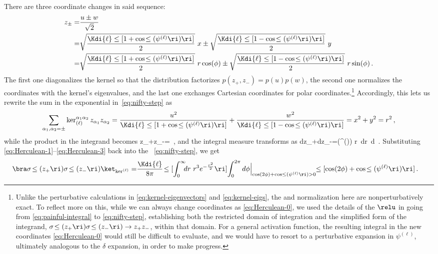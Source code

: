 There are three coordinate changes in said sequence:
\begin{align}\label{eq:Herculean-0}
z_{\pm}=&\frac{u\pm w}{\sqrt{2}} \\ 
=&\sqrt{\frac{\Kdi{\ell}\le[1+\cos\!\le(\psi^{(\ell)}\ri)\ri]}{2}}\ x \pm \sqrt{\frac{\Kdi{\ell}\le[1-\cos\!\le(\psi^{(\ell)}\ri)\ri]}{2}}\ y\, \notag \\
=&\sqrt{\frac{\Kdi{\ell}\le[1+\cos\!\le(\psi^{(\ell)}\ri)\ri]}{2}}\ r\cos(\phi) \pm \sqrt{\frac{\Kdi{\ell}\le[1-\cos\!\le(\psi^{(\ell)}\ri)\ri]}{2}}\ r\sin(\phi)\, .\notag
\end{align}
The first one diagonalizes the kernel so that the distribution factorizes $p(z_+,z_-) = p(u) p(w)$, the second one normalizes the coordinates with the kernel's eigenvalues, and the last one exchanges Cartesian coordinates for polar coordinates.\footnote{Unlike the perturbative calculations in \eqref{eq:kernel-eigenvectors} and \eqref{eq:kernel-eigs}, the  and normalization here are nonperturbatively exact.
To reflect more on this, while we can always change coordinates as \eqref{eq:Herculean-0}, we used the details of the $\relu$ in going from \eqref{eq:painful-integral} to \eqref{eq:nifty-step}, establishing both the restricted domain of integration and the simplified form of the integrand,  $\sigma\!\le(z_{+}\ri)\sigma\!\le(z_{-}\ri) \to z_{+}z_{-}$, within that domain. For a general activation function, the resulting integral in the new coordinates \eqref{eq:Herculean-0} would still be difficult to evaluate, and we would have to resort to a perturbative expansion in $\psi^{(\ell)}$, ultimately analogous to the $\delta$ expansion, in order to make progress.}
Accordingly, this lets us rewrite the sum in the exponential in~\eqref{eq:nifty-step} as
\begin{align}\label{eq:Herculean-1}
\sum_{\alpha_1,\alpha_2=\pm}\ker^{\alpha_1\alpha_2}_{(\ell)}z_{\alpha_1}z_{\alpha_2}= \frac{u^2}{\Kdi{\ell}\le[1+\cos\!\le(\psi^{(\ell)}\ri)\ri]}+\frac{w^2}{\Kdi{\ell}\le[1-\cos\!\le(\psi^{(\ell)}\ri)\ri]}=x^2+y^2=r^2\, ,
\end{align}
while the product in the integrand becomes
\be\label{eq:Herculean-2}
z_{+}z_{-}=\le[\cos(2\phi)+\cos\!\le(\psi^{(\ell)}\ri)\ri]\, ,
\ee
and the integral measure transforms as
\be\label{eq:Herculean-3}
dz_{+}dz_{-}=\Kdi{\ell}\sin\!\le(\psi^{(\ell)}\ri) r\, dr \,d\phi\, .
\ee
Substituting \eqref{eq:Herculean-1}--\eqref{eq:Herculean-3} back into the ~\eqref{eq:nifty-step}, we get
\begin{align}\label{eq:relu-non-perturbative-mid}
\bra\sigma\!\le(z_{+}\ri)\sigma\!\le(z_{-}\ri)\ket_{\ker^{(\ell)}}=&\frac{\Kdi{\ell}}{8\pi}\!\le[\int_{0}^{\infty}\!\!\!dr\ r^3 e^{-\frac{r^2}{2}}\ri]\! \int_{0}^{2\pi} d\phi \Big\vert_{\cos(2\phi)+\cos\le(\psi^{(\ell)}\ri)>0}\!\!\le[\cos(2\phi)+\cos\!\le(\psi^{(\ell)}\ri)\ri]\, .
\end{align}

